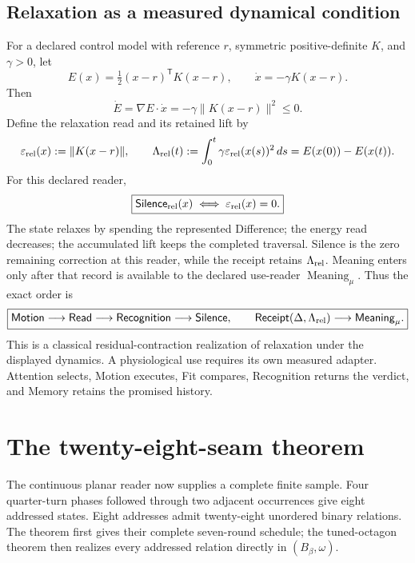 \documentclass[10pt]{article}
\begin{document}
\subsection*{Relaxation as a measured dynamical condition}
For a declared control model with reference $r$, symmetric positive-definite $K$, and $\gamma>0$, let
\begin{equation}E(x)=\tfrac12(x-r)^{\mathsf T}K(x-r),\qquad \dot x=-\gamma K(x-r).\end{equation}
Then
\begin{equation}\boxed{\dot E=\nabla E\cdot\dot x=-\gamma\|K(x-r)\|^2\le0.}\end{equation}
Define the relaxation read and its retained lift by
\begin{equation}
\varepsilon_{\rm rel}(x):=\|K(x-r)\|,
\qquad
\Lambda_{\rm rel}(t):=\int_0^t\gamma\varepsilon_{\rm rel}(x(s))^2\,ds
=E(x(0))-E(x(t)).
\end{equation}
For this declared reader,
\begin{equation}
\boxed{\mathsf{Silence}_{\rm rel}(x)
\iff\varepsilon_{\rm rel}(x)=0.}
\label{eq:relaxsilence}
\end{equation}
The state relaxes by spending the represented Difference; the energy read
decreases; the accumulated lift keeps the completed traversal. Silence is the
zero remaining correction at this reader, while the receipt retains
$\Lambda_{\rm rel}$. Meaning enters only after that record is available to the
declared use-reader $\operatorname{Meaning}_\mu$. Thus the exact order is
\begin{equation}
\boxed{\mathsf{Motion}\longrightarrow\mathsf{Read}
\longrightarrow\mathsf{Recognition}\longrightarrow
\mathsf{Silence},\qquad
\mathsf{Receipt}(\Delta,\Lambda_{\rm rel})
\longrightarrow\mathsf{Meaning}_\mu.}
\end{equation}
This is a classical residual-contraction realization of relaxation under the
displayed dynamics. A physiological use requires its own measured adapter.
Attention selects, Motion executes, Fit compares, Recognition returns the
verdict, and Memory retains the promised history.


\section{The twenty-eight-seam theorem}\label{sec:seam}
The continuous planar reader now supplies a complete finite sample. Four quarter-turn phases followed through two adjacent occurrences give eight addressed states. Eight addresses admit twenty-eight unordered binary relations. The theorem first gives their complete seven-round schedule; the tuned-octagon theorem then realizes every addressed relation directly in $(B_\beta,\omega)$.
\end{document}
